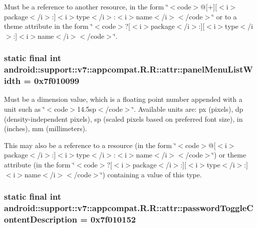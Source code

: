 Must be a reference to another resource, in the form \char`\"{}$<$code$>$@\mbox{[}+\mbox{]}\mbox{[}$<$i$>$package$<$/i$>$:\mbox{]}$<$i$>$type$<$/i$>$:$<$i$>$name$<$/i$>$$<$/code$>$\char`\"{} or to a theme attribute in the form \char`\"{}$<$code$>$?\mbox{[}$<$i$>$package$<$/i$>$:\mbox{]}\mbox{[}$<$i$>$type$<$/i$>$:\mbox{]}$<$i$>$name$<$/i$>$$<$/code$>$\char`\"{}. \hypertarget{classandroid_1_1support_1_1v7_1_1appcompat_1_1_r_1_1attr_f15465044564f9da5d115965abc26bc0}{
\subsubsection[{panelMenuListWidth}]{\setlength{\rightskip}{0pt plus 5cm}static final int android::support::v7::appcompat.R.R::attr::panelMenuListWidth = 0x7f010099}}
\label{classandroid_1_1support_1_1v7_1_1appcompat_1_1_r_1_1attr_f15465044564f9da5d115965abc26bc0}


Must be a dimension value, which is a floating point number appended with a unit such as \char`\"{}$<$code$>$14.5sp$<$/code$>$\char`\"{}. Available units are: px (pixels), dp (density-independent pixels), sp (scaled pixels based on preferred font size), in (inches), mm (millimeters). 

This may also be a reference to a resource (in the form \char`\"{}$<$code$>$@\mbox{[}$<$i$>$package$<$/i$>$:\mbox{]}$<$i$>$type$<$/i$>$:$<$i$>$name$<$/i$>$$<$/code$>$\char`\"{}) or theme attribute (in the form \char`\"{}$<$code$>$?\mbox{[}$<$i$>$package$<$/i$>$:\mbox{]}\mbox{[}$<$i$>$type$<$/i$>$:\mbox{]}$<$i$>$name$<$/i$>$$<$/code$>$\char`\"{}) containing a value of this type. \hypertarget{classandroid_1_1support_1_1v7_1_1appcompat_1_1_r_1_1attr_7950f71800f19316e98e7a26a15d0ef4}{
\subsubsection[{passwordToggleContentDescription}]{\setlength{\rightskip}{0pt plus 5cm}static final int android::support::v7::appcompat.R.R::attr::passwordToggleContentDescription = 0x7f010152}}
\label{classandroid_1_1support_1_1v7_1_1appcompat_1_1_r_1_1attr_7950f71800f19316e98e7a26a15d0ef4}


